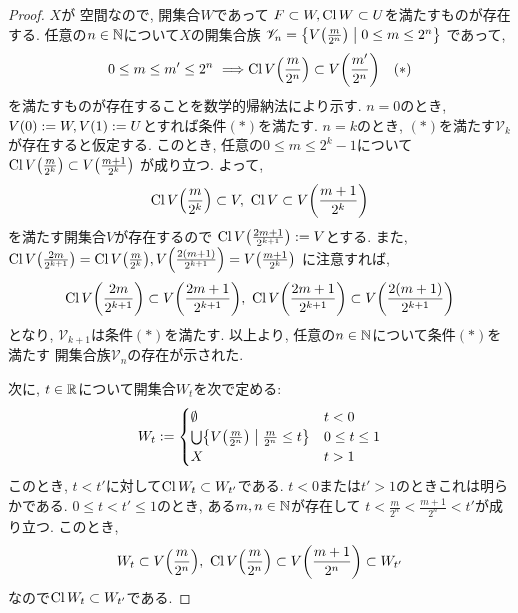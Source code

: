 \documentclass[uplatex, dvipdfmx, a4paper, 12pt, class=jsbook, crop=false]{standalone}
\begin{document}
\begin{proof}
	\( X \)が  空間なので, 開集合\( W \)であって
	\( F \subset W, \mathop{\mathrm{Cl}}\nolimits W \subset U \)を満たすものが存在する.
	任意の\( n \in \mathbb{N} \)について\( X \)の開集合族
	\( \mathscr{V}_n = \setcomp{V\lrparen{{\frac{m}{2^n}}}}{0\leq m \leq 2^n} \)
	であって,
	\[ 0 \leq m \leq m' \leq 2^n \ \Longrightarrow
	\topcl V\lrparen{\frac{m}{2^n}} \subset V\lrparen{\frac{m'}{2^n}} \ \ \ (\ast) \]
	を満たすものが存在することを数学的帰納法により示す.
	\( n = 0 \)のとき, \( V\lrparen{0} \defeq W, V\lrparen{1} \defeq U \)とすれば条件\( (\ast) \)を満たす.
	\( n = k \)のとき, \( (\ast) \)を満たす\( \mathscr{V}_k \)が存在すると仮定する.
	このとき, 任意の\( 0 \leq m \leq 2^k - 1 \)について
	\( \topcl V\lrparen{\frac{m}{2^k}} \subset V\lrparen{\frac{m+1}{2^k}} \)
	が成り立つ.
	よって,
	\[ \topcl V\lrparen{\frac{m}{2^k}} \subset V, \
	\topcl V \subset V\lrparen{\frac{m+1}{2^k}} \]
	を満たす開集合$ V $が存在するので
	\( \topcl V\lrparen{\frac{2m+1}{2^{k+1}}} \defeq V \)とする.
	また, \( \topcl V\lrparen{\frac{2m}{2^{k+1}}}
	= \topcl V\lrparen{\frac{m}{2^k}},
	V\lrparen{\frac{2(m+1)}{2^{k+1}}} = V\lrparen{\frac{m+1}{2^k}} \)
	に注意すれば,
	\[ \topcl V\lrparen{\frac{2m}{2^{k+1}}} \subset V\lrparen{\frac{2m+1}{2^{k+1}}}, \
	\topcl V\lrparen{\frac{2m+1}{2^{k+1}}} \subset V\lrparen{\frac{2(m+1)}{2^{k+1}}} \]
	となり, \( \mathscr{V}_{k+1} \)は条件\( (\ast) \)を満たす.
	以上より, 任意の\( n \in \mathbb{N} \)について条件\( (\ast) \)を満たす
	開集合族\( \mathscr{V}_n \)の存在が示された.

	次に, \( t \in \mathbb{R} \)について開集合\( W_t \)を次で定める:
	\[ W_t \defeq \begin{cases}
		\emptyset & t < 0 \\
		\bigcup \setcomp{V\lrparen{\frac{m}{2^n}}}{\frac{m}{2^n} \leq t} & 0 \leq t \leq 1 \\
		X & t > 1
	\end{cases}\]
	このとき, \( t < t' \)に対して\( \mathop{\mathrm{Cl}}\nolimits W_t \subset W_{t'} \)である.
	\( t < 0 \)または\( t' > 1 \)のときこれは明らかである.
	\( 0 \leq t < t' \leq 1 \)のとき,
	ある\( m, n \in \mathbb{N} \)が存在して
	\( t < \frac{m}{2^n} < \frac{m+1}{2^n} < t' \)が成り立つ.
	このとき, \[ W_t \subset V\lrparen{\frac{m}{2^n}}, \
	\topcl V\lrparen{\frac{m}{2^n}} \subset V\lrparen{\frac{m+1}{2^n}} \subset W_{t'} \]
	なので\( \mathop{\mathrm{Cl}}\nolimits W_t \subset W_{t'} \)である.


\end{proof}
\end{document}
